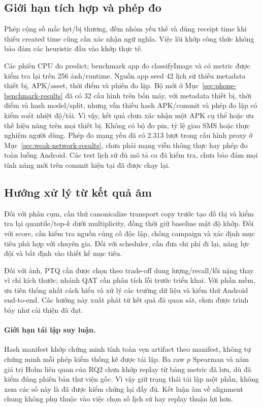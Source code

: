 \subsection{Giới hạn tích hợp và phép đo}
Phép cộng số mắc kẹt/bị thương, đếm nhóm yếu thế và dùng receipt time khi thiếu created time cũng cần xác nhận ngữ nghĩa. Việc lõi khớp công thức không bảo đảm các heuristic đầu vào khớp thực tế.

Các phiên CPU đo predict; benchmark app đo classifyImage và có metric được kiểm tra lại trên 256 ảnh/runtime. Nguồn app seed 42 lịch sử thiếu metadata thiết bị, APK/asset, thời điểm và phiên đo lặp. Bộ mới ở Mục~\ref{sec:phone-benchmark-results} đã có 32 cấu hình trên bốn máy, với metadata thiết bị, thời điểm và hash model/split, nhưng vẫn thiếu hash APK/commit và phép đo lặp có kiểm soát nhiệt độ/tải. Vì vậy, kết quả chưa xác nhận một APK cụ thể hoặc ưu thế hiệu năng trên mọi thiết bị. Không có bộ đo pin, tỷ lệ giao SMS hoặc thực nghiệm người dùng. Phép đo mạng yếu đã có 2.313 lượt trong cấu hình proxy ở Mục~\ref{sec:weak-network-results}, chưa phải mạng viễn thông thực hay phép đo toàn luồng Android. Các test lịch sử đủ mô tả ca đã kiểm tra, chưa bảo đảm mọi tính năng mới trên commit hiện tại đã được chạy lại.

\subsection{Hướng xử lý từ kết quả âm}
Đối với phân cụm, cần thử canonicalize transport copy trước tạo đồ thị và kiểm tra lại quantile/top-$k$ dưới multiplicity, đồng thời giữ baseline mật độ khớp. Đối với score, cần kiểm tra nguồn củng cố độc lập, chống campaign và xác định mục tiêu phù hợp với chuyên gia. Đối với scheduler, cần đưa chi phí đi lại, năng lực đội và bất định vào thiết kế mục tiêu.

Đối với ảnh, PTQ cần được chọn theo trade-off dung lượng/recall/lỗi nặng thay vì chỉ kích thước; nhánh QAT cần phân tích lỗi trước triển khai. Với phần mềm, ưu tiên thống nhất cách hiểu và xử lý các trường dữ liệu và kiểm thử Android end-to-end. Các hướng này xuất phát từ kết quả đã quan sát, chưa được trình bày như cải thiện đã đạt.

\paragraph{Giới hạn tái lập suy luận.} Hash manifest khớp chứng minh tính toàn vẹn artifact theo manifest, không tự chứng minh mỗi phép kiểm thống kê được tái lập. Ba raw $p$ Spearman và năm giá trị Holm liên quan của RQ2 chưa khớp replay từ bảng metric đã lưu, dù đã kiểm đúng phiên bản thư viện gốc. Vì vậy giữ trạng thái tái lập một phần, không xem các số này là đã được kiểm chứng lại đầy đủ. Kết luận âm về alignment chung không phụ thuộc vào việc chọn số lịch sử hay replay thuận lợi hơn.


